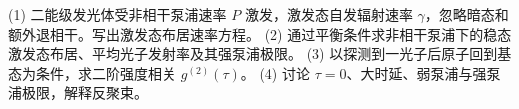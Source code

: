(1) 二能级发光体受非相干泵浦速率 \(P\) 激发，激发态自发辐射速率 \(\gamma\)，忽略暗态和额外退相干。写出激发态布居速率方程。
(2) 通过平衡条件求非相干泵浦下的稳态激发态布居、平均光子发射率及其强泵浦极限。
(3) 以探测到一光子后原子回到基态为条件，求二阶强度相关 \(g^{(2)}(\tau)\)。
(4) 讨论 \(\tau=0\)、大时延、弱泵浦与强泵浦极限，解释反聚束。
